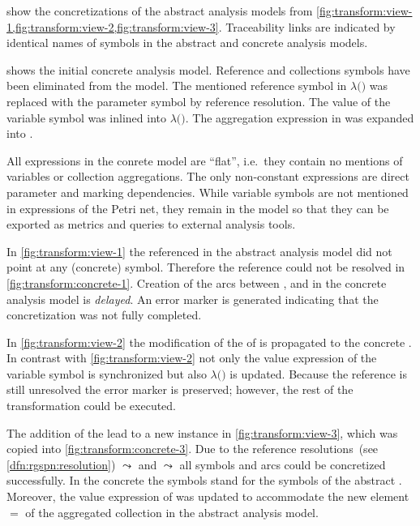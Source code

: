 \begin{runningExample}
   show the concretizations of the abstract analysis models from \vref{fig:transform:view-1,fig:transform:view-2,fig:transform:view-3}. Traceability links are indicated by identical names of symbols in the abstract and concrete analysis models.

   shows the initial concrete analysis model. Reference and collections symbols have been eliminated from the model. The mentioned reference symbol  in  \(\lambda(\)\()\) was replaced with the parameter symbol  by reference resolution. The value of the variable symbol  was inlined into \(\lambda(\)\()\). The aggregation expression in  was expanded into .

  All expressions in the conrete model are \enquote{flat}, i.e.~they contain no mentions of variables or collection aggregations. The only non-constant expressions are direct parameter and marking dependencies. While variable symbols are not mentioned in expressions of the Petri net, they remain in the model so that they can be exported as metrics and queries to external analysis tools.

  In \vref{fig:transform:view-1} the referenced  in the abstract analysis model did not point at any (concrete) symbol. Therefore the reference could not be resolved in \vref{fig:transform:concrete-1}. Creation of the arcs between ,  and  in the concrete analysis model is \emph{delayed}. An error marker is generated indicating that the concretization was not fully completed.

  In \vref{fig:transform:view-2} the modification of the  of  is propagated to the concrete . In contrast with \vref{fig:transform:view-2} not only the value expression of the variable symbol  is synchronized but also \(\lambda(\)\()\) is updated. Because the reference  is still unresolved the error marker is preserved; however, the rest of the transformation could be executed.

  The addition of the   lead to a new  instance  in \vref{fig:transform:view-3}, which was copied into \vref{fig:transform:concrete-3}. Due to the reference resolutions~(see \vref{dfn:rgspn:resolution})  \(\leadsto\)  and  \(\leadsto\)  all symbols and arcs could be concretized successfully. In the concrete  the  symbols stand for the  symbols of the abstract . Moreover, the value expression of  was updated to accommodate the new element  \(=\)  of the aggregated collection  in the abstract analysis model.
\end{runningExample}

